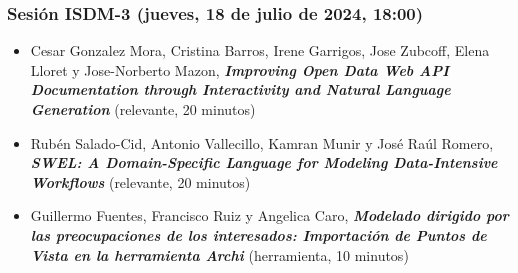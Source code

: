 \begin{frame}
  \frametitle{Sesión ISDM-3 (jueves, 18 de julio de 2024, 18:00)}
\begin{itemize}

\item \small{Cesar Gonzalez Mora, Cristina Barros, Irene Garrigos, Jose Zubcoff, Elena Lloret y Jose-Norberto Mazon}, %
      {\bfseries\itshape Improving Open Data Web API Documentation through Interactivity and Natural Language Generation} %
      \small{(relevante, 20 minutos)}

\item \small{Rubén Salado-Cid, Antonio Vallecillo, Kamran Munir y José Raúl Romero}, %
      {\bfseries\itshape SWEL: A Domain-Specific Language for Modeling Data-Intensive Workflows} %
      \small{(relevante, 20 minutos)}

\item \small{Guillermo Fuentes, Francisco Ruiz y Angelica Caro}, %
      {\bfseries\itshape Modelado dirigido por las preocupaciones de los interesados: Importación de Puntos de Vista en la herramienta Archi} %
      \small{(herramienta, 10 minutos)}

\end{itemize}
\end{frame}